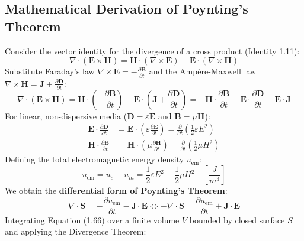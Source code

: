 \subsection{Mathematical Derivation of Poynting's Theorem}
Consider the vector identity for the divergence of a cross product (Identity 1.11):
\begin{equation}
    \nabla \cdot (\mathbf{E} \times \mathbf{H}) = \mathbf{H} \cdot (\nabla \times \mathbf{E}) - \mathbf{E} \cdot (\nabla \times \mathbf{H})
\end{equation}
Substitute Faraday's law $\nabla \times \mathbf{E} = -\frac{\partial \mathbf{B}}{\partial t}$ and the Ampère-Maxwell law $\nabla \times \mathbf{H} = \mathbf{J} + \frac{\partial \mathbf{D}}{\partial t}$:
\begin{equation}
    \nabla \cdot (\mathbf{E} \times \mathbf{H}) = \mathbf{H} \cdot \left( -\frac{\partial \mathbf{B}}{\partial t} \right) - \mathbf{E} \cdot \left( \mathbf{J} + \frac{\partial \mathbf{D}}{\partial t} \right) = -\mathbf{H} \cdot \frac{\partial \mathbf{B}}{\partial t} - \mathbf{E} \cdot \frac{\partial \mathbf{D}}{\partial t} - \mathbf{E} \cdot \mathbf{J}
\end{equation}
For linear, non-dispersive media ($\mathbf{D} = \varepsilon \mathbf{E}$ and $\mathbf{B} = \mu \mathbf{H}$):
\begin{align}
    \mathbf{E} \cdot \frac{\partial \mathbf{D}}{\partial t} &= \mathbf{E} \cdot \left( \varepsilon \frac{\partial \mathbf{E}}{\partial t} \right) = \frac{\partial}{\partial t}\left( \frac{1}{2} \varepsilon E^2 \right) \\
    \mathbf{H} \cdot \frac{\partial \mathbf{B}}{\partial t} &= \mathbf{H} \cdot \left( \mu \frac{\partial \mathbf{H}}{\partial t} \right) = \frac{\partial}{\partial t}\left( \frac{1}{2} \mu H^2 \right)
\end{align}
Defining the total electromagnetic energy density $u_{\text{em}}$:
\begin{equation}
    u_{\text{em}} = u_e + u_m = \frac{1}{2}\varepsilon E^2 + \frac{1}{2}\mu H^2 \quad \left[\si{\frac{J}{m^3}}\right]
\end{equation}
We obtain the \textbf{differential form of Poynting's Theorem}:
\begin{equation}
    \nabla \cdot \mathbf{S} = -\frac{\partial u_{\text{em}}}{\partial t} - \mathbf{J} \cdot \mathbf{E} \iff -\nabla \cdot \mathbf{S} = \frac{\partial u_{\text{em}}}{\partial t} + \mathbf{J} \cdot \mathbf{E}
\end{equation}
Integrating Equation (1.66) over a finite volume $V$ bounded by closed surface $S$ and applying the Divergence Theorem:

